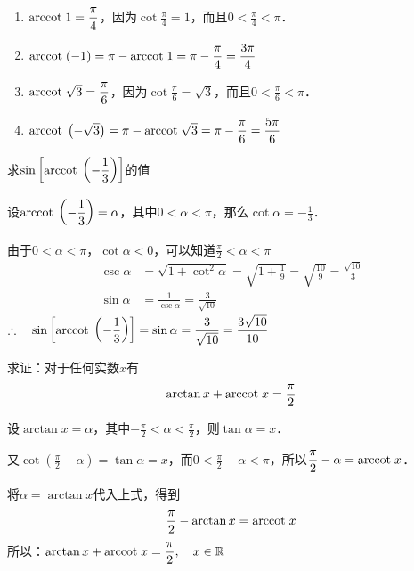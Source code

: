\begin{solution}
\begin{enumerate}
    \item ${\rm arccot\; } 1=\dfrac{\pi}{4}$，因为$\cot\frac{\pi}{4}=1$，而且$0<\frac{\pi}{4}<\pi$．
    \item ${\rm arccot\; } (- 1)=\pi-{\rm arccot\; } 1=\pi-\dfrac{\pi}{4}=\dfrac{3\pi}{4}$
    \item ${\rm arccot\; } \sqrt{3}=\dfrac{\pi}{6}$，因为$\cot\frac{\pi}{6}=\sqrt{3}$，而且$0<\frac{\pi}{6}<\pi$．
    \item ${\rm arccot\; } \left(-\sqrt{3}\right)=\pi-{\rm arccot\; }\sqrt{3}=\pi-\dfrac{\pi}{6}=\dfrac{5\pi}{6}$
\end{enumerate}
\end{solution}


\begin{example}
    求$\sin\left[{\rm arccot\; }\left(-\dfrac{1}{3}\right)\right]$的值
\end{example}

\begin{solution}
    设${\rm arccot\; }\left(-\dfrac{1}{3}\right)=\alpha$，其中$0<\alpha<\pi$，那么$\cot\alpha=-\frac{1}{3}$．

    由于$0<\alpha<\pi$，$\cot\alpha<0$，可以知道$\frac{\pi}{2}<\alpha<\pi$
\[\begin{split}
    \csc\alpha&=\sqrt{1+\cot^2\alpha}=\sqrt{1+\frac{1}{9}}=\sqrt{\frac{10}{9}}=\frac{\sqrt{10}}{3}\\
    \sin\alpha&=\frac{1}{\csc\alpha}=\frac{3}{\sqrt{10}}
\end{split}\]
$\therefore\quad \sin\left[{\rm arccot\; }\left(-\dfrac{1}{3}\right)\right]=\sin\alpha=\dfrac{3}{\sqrt{10}}=\dfrac{3\sqrt{10}}{10}$
\end{solution}


\begin{example}
    求证：对于任何实数$x$有
\[\arctan x+{\rm arccot\; } x=\dfrac{\pi}{2}\]
\end{example}

\begin{solution}
    设$\arctan x=\alpha$，其中$-\frac{\pi}{2}<\alpha<\frac{\pi}{2}$，则$\tan\alpha=x$．

    又$\cot\left(\frac{\pi}{2}-\alpha\right)=\tan\alpha=x$，而$0<\frac{\pi}{2}-\alpha<\pi$，所以$\dfrac{\pi}{2}-\alpha={\rm arccot\; } x$．

    将$\alpha=\arctan x$代入上式，得到
    \[\dfrac{\pi}{2}-\arctan x={\rm arccot\; } x\]
    所以：$\arctan x+{\rm arccot\; } x=\dfrac{\pi}{2},\quad x\in\mathbb{R}$
\end{solution}


